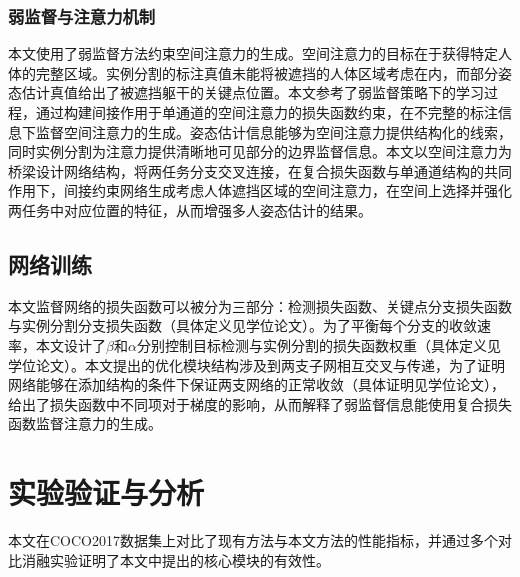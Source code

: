 \begin{outstandingabstract}
 	\subsubsection{弱监督与注意力机制}
 	本文使用了弱监督方法约束空间注意力的生成。空间注意力的目标在于获得特定人体的完整区域。实例分割的标注真值未能将被遮挡的人体区域考虑在内，而部分姿态估计真值给出了被遮挡躯干的关键点位置。本文参考了弱监督策略下的学习过程，通过构建间接作用于单通道的空间注意力的损失函数约束，在不完整的标注信息下监督空间注意力的生成。姿态估计信息能够为空间注意力提供结构化的线索，同时实例分割为注意力提供清晰地可见部分的边界监督信息。本文以空间注意力为桥梁设计网络结构，将两任务分支交叉连接，在复合损失函数与单通道结构的共同作用下，间接约束网络生成考虑人体遮挡区域的空间注意力，在空间上选择并强化两任务中对应位置的特征，从而增强多人姿态估计的结果。
 	
 	\subsection{网络训练}
 	本文监督网络的损失函数可以被分为三部分：检测损失函数、关键点分支损失函数与实例分割分支损失函数（具体定义见学位论文）。为了平衡每个分支的收敛速率，本文设计了$\beta$和$\alpha$分别控制目标检测与实例分割的损失函数权重（具体定义见学位论文）。本文提出的优化模块结构涉及到两支子网相互交叉与传递，为了证明网络能够在添加结构的条件下保证两支网络的正常收敛（具体证明见学位论文），给出了损失函数中不同项对于梯度的影响，从而解释了弱监督信息能使用复合损失函数监督注意力的生成。

    \section{实验验证与分析}
	本文在COCO2017数据集上对比了现有方法与本文方法的性能指标，并通过多个对比消融实验证明了本文中提出的核心模块的有效性。


\end{outstandingabstract}
